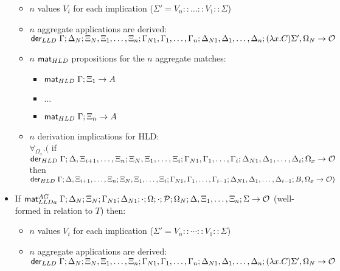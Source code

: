 \begin{theorem}
\begin{itemize}[leftmargin=*]
   \begin{itemize}[leftmargin=\secondm]
      \item $n$ values $V_i$ for each implication ($\Sigma' = V_n :: \dots :: V_1 :: \Sigma$)
      \item $n$ aggregate applications are derived:\\
      $\mathsf{der}_{LLD} \; \Gamma; \Delta_N; \Xi_N, \Xi_1, \dotsc, \Xi_n; \Gamma_{N1},
      \Gamma_1, \dotsc, \Gamma_n; \Delta_{N1}, \Delta_1, \dotsc, \Delta_n;
(\lambda x. C)\Sigma', \Omega_N \rightarrow \mathcal{O}$
      \item $n$ $\mathsf{mat}_{HLD} \;$propositions for the $n$ aggregate matches:
      \begin{itemize}[leftmargin=\thirdm]
         \item $\mathsf{mat}_{HLD} \; \Gamma; \Xi_1 \rightarrow A$
         \item $\dots$
         \item $\mathsf{mat}_{HLD} \; \Gamma; \Xi_n \rightarrow A$
      \end{itemize}
      \item $n$ derivation implications for HLD: \\
      $\forall_{\Omega_x}.($ if $\mathsf{der}_{HLD} \; \Gamma; \Delta, \Xi_{i+1}, \dotsc, \Xi_{n}; \Xi_N, \Xi_1,
            \dotsc, \Xi_i; \Gamma_{N1}, \Gamma_1, \dotsc, \Gamma_i; \Delta_{N1},
            \Delta_1, \dotsc, \Delta_i; \Omega_x \rightarrow \mathcal{O}$ then $\mathsf{der}_{HLD} \; \Gamma; \Delta, \Xi_{i+1}, \dotsc, \Xi_{n}; \Xi_N, \Xi_1,
            \dotsc,
            \Xi_i; \Gamma_{N1}, \Gamma_1, \dotsc, \Gamma_{i-1}; \Delta_{N1},
            \Delta_1, \dotsc, \Delta_{i-1}; B, \Omega_x \rightarrow \mathcal{O})$
   \end{itemize}

   \item If $\mathsf{mat}_{LLDa}^{AG} \; \Gamma; \Delta_N; \Xi_N; \Gamma_{N1}; \Delta_{N1}; \cdot; \Omega;
      \cdot; \mathcal{P}; \Omega_N; \Delta, \Xi_1, \dotsc, \Xi_n; \Sigma \rightarrow \mathcal{O}$ (well-formed in relation to $T$) then:

   \begin{itemize}[leftmargin=\secondm]
      \item $n$ values $V_i$ for each implication ($\Sigma' = V_n :: \dotsb :: V_1 :: \Sigma$)
      \item $n$ aggregate applications are derived:\\
      $\mathsf{der}_{LLD} \; \Gamma; \Delta_N; \Xi_N, \Xi_1, \dotsc, \Xi_n; \Gamma_{N1},
      \Gamma_1, \dotsc, \Gamma_n; \Delta_{N1}, \Delta_1, \dotsc, \Delta_n;
(\lambda x. C)\Sigma', \Omega_N \rightarrow \mathcal{O}$


\end{itemize}
\end{itemize}
\end{theorem}

